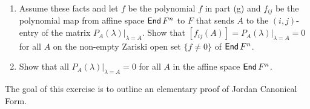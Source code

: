 \begin{problem}
\begin{enumerate}\addtocounter{enumi}{7}
  \item Assume these facts and let $f$ be the polynomial $f$ in part (g) and $f_{ij}$ be the polynomial map from affine space $\operatorname{\text{\normalfont\sffamily End}} F^n$ to $F$ that sends $A$ to the $(i, j)$-entry of the matrix $P_A (\lambda) \big|_{\lambda = A}$. Show that $[f_{ij} (A)] = P_A (\lambda) \big|_{\lambda = A} = 0$ for all $A$ on the non-empty Zariski open set $\{ f \neq 0 \}$ of $\operatorname{\text{\normalfont\sffamily End}} F^n$.
  \item Show that all $P_A (\lambda) \big|_{\lambda = A} = 0$ for all $A$ in the affine space $\operatorname{\text{\normalfont\sffamily End}} F^n$.
\end{enumerate}
\end{problem}

\begin{remark}
  The goal of this exercise is to outline an elementary proof of Jordan Canonical Form.
\end{remark}

